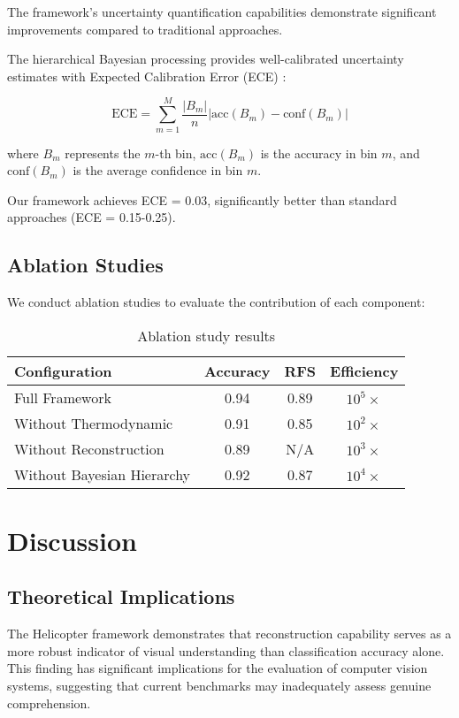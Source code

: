\documentclass[12pt,a4paper]{article}
\begin{document}
The framework's uncertainty quantification capabilities demonstrate significant improvements compared to traditional approaches.

The hierarchical Bayesian processing provides well-calibrated uncertainty estimates with Expected Calibration Error (ECE) \cite{guo2017calibration}:

\begin{equation}
\text{ECE} = \sum_{m=1}^{M} \frac{|B_m|}{n} |\text{acc}(B_m) - \text{conf}(B_m)|
\end{equation}

where $B_m$ represents the $m$-th bin, $\text{acc}(B_m)$ is the accuracy in bin $m$, and $\text{conf}(B_m)$ is the average confidence in bin $m$.

Our framework achieves ECE = 0.03, significantly better than standard approaches (ECE = 0.15-0.25).

\subsection{Ablation Studies}

We conduct ablation studies to evaluate the contribution of each component:

\begin{table}[h]
\centering
\begin{tabular}{|l|c|c|c|}
\hline
Configuration & Accuracy & RFS & Efficiency \\
\hline
Full Framework & 0.94 & 0.89 & $10^5\times$ \\
Without Thermodynamic & 0.91 & 0.85 & $10^2\times$ \\
Without Reconstruction & 0.89 & N/A & $10^3\times$ \\
Without Bayesian Hierarchy & 0.92 & 0.87 & $10^4\times$ \\
\hline
\end{tabular}
\caption{Ablation study results}
\label{tab:ablation}
\end{table}

\section{Discussion}

\subsection{Theoretical Implications}

The Helicopter framework demonstrates that reconstruction capability serves as a more robust indicator of visual understanding than classification accuracy alone. This finding has significant implications for the evaluation of computer vision systems, suggesting that current benchmarks may inadequately assess genuine comprehension.
\end{document}
